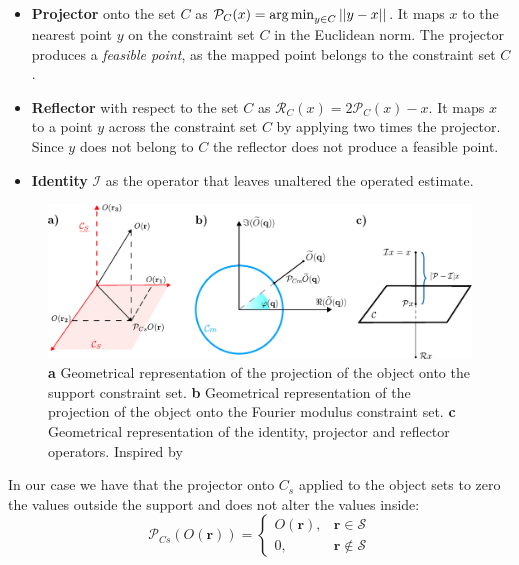 \begin{itemize}

    \item \textbf{Projector} onto the set $C$ as $\mathcal{P}_C(x) = \operatorname*{arg\,min}_{y \in C} || y - x || $. It maps $x$ to the 
    nearest point $y$ on the constraint set $C$ in the Euclidean norm. The projector produces a \textit{feasible point}, 
    as the mapped point belongs to the constraint set $C$. 

    \item \textbf{Reflector} with respect to the set $C$ as $\mathcal{R}_C(x) = 2\mathcal{P}_C(x) - x$. It maps $x$ to 
    a point $y$ across the constraint set $C$ by applying two times the projector. Since $y$ does not belong to $C$ 
    the reflector does not produce a feasible point. 
    \item \textbf{Identity} $\mathcal{I}$ as the operator that leaves unaltered the operated estimate. 
\end{itemize}

\begin{figure}[H]
    \centering
    \includegraphics[width=\textwidth]{figures/Intro/projections.pdf}
    \caption{\textbf{a} Geometrical representation of the projection of the object onto the support constraint set.  
    \textbf{b} Geometrical representation of the projection of the object onto the Fourier modulus constraint set.
    \textbf{c} Geometrical representation of the identity, projector and reflector operators. Inspired by \cite{marchesini_unified_2007}}
    \label{fig:projections}
\end{figure}

In our case we have that the projector onto $C_s$ applied to the object sets to zero the values outside the support and does not 
alter the values inside: 
\begin{equation}
    \mathcal{P}_{Cs}(O(\mathbf{r})) = 
    \begin{cases}
        O(\mathbf{r}), & \mathbf{r} \in \mathcal{S} \\
        0,  &  \mathbf{r} \notin \mathcal{S}
     \end{cases}
\end{equation}

